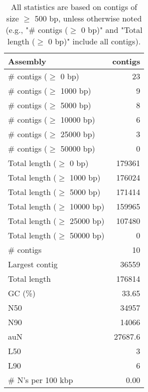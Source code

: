 \documentclass[12pt,a4paper]{article}
\begin{document}
\begin{table}[ht]
\begin{center}
\caption{All statistics are based on contigs of size $\geq$ 500 bp, unless otherwise noted (e.g., "\# contigs ($\geq$ 0 bp)" and "Total length ($\geq$ 0 bp)" include all contigs).}
\begin{tabular}{|l*{1}{|r}|}
\hline
Assembly & contigs \\ \hline
\# contigs ($\geq$ 0 bp) & 23 \\ \hline
\# contigs ($\geq$ 1000 bp) & 9 \\ \hline
\# contigs ($\geq$ 5000 bp) & 8 \\ \hline
\# contigs ($\geq$ 10000 bp) & 6 \\ \hline
\# contigs ($\geq$ 25000 bp) & 3 \\ \hline
\# contigs ($\geq$ 50000 bp) & 0 \\ \hline
Total length ($\geq$ 0 bp) & 179361 \\ \hline
Total length ($\geq$ 1000 bp) & 176024 \\ \hline
Total length ($\geq$ 5000 bp) & 171414 \\ \hline
Total length ($\geq$ 10000 bp) & 159965 \\ \hline
Total length ($\geq$ 25000 bp) & 107480 \\ \hline
Total length ($\geq$ 50000 bp) & 0 \\ \hline
\# contigs & 10 \\ \hline
Largest contig & 36559 \\ \hline
Total length & 176814 \\ \hline
GC (\%) & 33.65 \\ \hline
N50 & 34957 \\ \hline
N90 & 14066 \\ \hline
auN & 27687.6 \\ \hline
L50 & 3 \\ \hline
L90 & 6 \\ \hline
\# N's per 100 kbp & 0.00 \\ \hline
\end{tabular}
\end{center}
\end{table}
\end{document}
